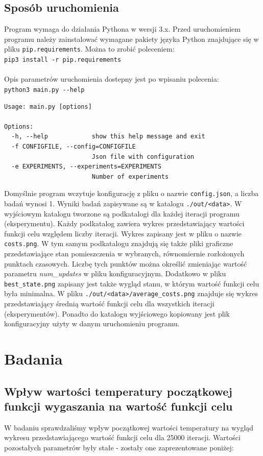 \documentclass[12pt,a4paper]{article}
\begin{document}
\subsection{Sposób uruchomienia}
Program wymaga do działania Pythona w wersji 3.x.
Przed uruchomieniem programu należy zainstalować wymagane pakiety języka Python
znajdujące się w pliku \texttt{pip.requirements}. Można to zrobić poleceniem:\\
\texttt{pip3 install -r pip.requirements}\\\\
Opis parametrów uruchomienia dostepny jest po wpisaniu polecenia:\\
\texttt{python3 main.py -{}-help}
\begin{verbatim}
Usage: main.py [options]

Options:
  -h, --help            show this help message and exit
  -f CONFIGFILE, --config=CONFIGFILE
                        Json file with configuration
  -e EXPERIMENTS, --experiments=EXPERIMENTS
                        Number of experiments
\end{verbatim}
Domyślnie program wczytuje konfigurację z pliku o nazwie \texttt{config.json},
a liczba badań wynosi 1. Wyniki badań zapisywane są w katalogu
\texttt{./out/<data>}. W wyjściowym katalogu tworzone są podkatalogi dla
każdej iteracji programu (eksperymentu). Każdy podkatalog zawiera wykres
przedstawiający wartości funkcji celu względem liczby iteracji. Wykres zapisany
jest w pliku o nazwie \texttt{costs.png}. W tym samym podkatalogu znajdują
się także pliki graficzne przedstawiające stan pomieszczenia w wybranych,
równomiernie rozłożonych punktach czasowych. Liczbę tych punktów można
określić zmieniając wartość parametru \emph{num\_updates} w pliku konfiguracyjnym.
Dodatkowo w pliku \texttt{best\_state.png} zapisany jest także wygląd stanu,
w którym wartość funkcji celu była minimalna.
W pliku \texttt{./out/<data>/average\_costs.png} znajduje się wykres przedstawiający
średnią wartość funkcji celu dla wszystkich iteracji (eksperymentów).
Ponadto do katalogu wyjściowego kopiowany jest plik konfiguracyjny użyty w danym
uruchomieniu programu.


\section{Badania}
\subsection{Wpływ wartości temperatury początkowej funkcji wygaszania na wartość
funkcji celu}
W badaniu sprawdzaliśmy wpływ początkowej wartości temperatury na wygląd wykresu
przedstawiającego wartość funkcji celu dla 25000 iteracji. Wartości pozostałych
parametrów były stałe - zostały one zaprezentowane poniżej:
\end{document}
